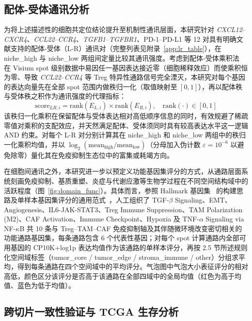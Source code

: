 \documentclass[12pt, a4paper]{ctexart}
\begin{document}
\subsection{配体-受体通讯分析}

为将上述描述性的细胞共定位结论提升至机制性通讯层面，本研究针对 \textit{CXCL12}--\textit{CXCR4}、\textit{CCL22}--\textit{CCR4}、\textit{TGFB1}--\textit{TGFBR1}、PD-1--PD-L1 等 12 对具有明确文献支持的配体-受体（L-R）通讯对（完整列表见附录~\ref{app:lr_table}），在 niche\_high 与 niche\_low 两组间定量比较其通讯强度。考虑到配体-受体乘积法~\citep{efremova2020cellphonedb} 在 Visium spot 级别数据中易因任一基因表达接近零（细胞稀释效应）而使乘积恒为零、导致 \textit{CCL22}--\textit{CCR4} 等 Treg 特异性通路信号完全湮灭，本研究对每个基因的表达向量先在全部 spot 范围内做秩归一化（取值映射至 $[0,1]$），再以配体秩与受体秩之积作为通讯强度的代理指标：
\begin{equation*}
\text{score}_{LR,i} = \text{rank}(E_{L,i}) \times \text{rank}(E_{R,i}), \quad \text{rank}(\cdot) \in [0,1]
\end{equation*}
该秩归一化乘积在保留配体与受体表达相对高低顺序信息的同时，有效规避了稀疏零值对乘积的支配效应，并天然满足配体、受体须同时具有较高表达水平这一逻辑 AND 约束。对每个 L-R 对分别计算其在 niche\_high 和 niche\_low 两组中的秩归一化乘积均值，并以 $\log_2(\text{mean}_{\text{high}}/\text{mean}_{\text{low}})$（分母加入伪计数 $\varepsilon = 10^{-6}$ 以避免除零）量化其在免疫抑制生态位中的富集或耗竭方向。

在细胞间通讯之外，本研究进一步以预定义功能基因集评分的方式，从通路层面系统刻画免疫抑制、基质重塑、炎症与代谢应激等生物学过程在不同空间结构域中的活跃程度（图~\ref{fig:domain_func}）。具体而言，参照 Hallmark 基因集~\citep{liberzon2015molecular} 的构建思路及单样本基因集评分的通用范式~\citep{barbie2009systematic}，人工组织了 TGF-$\beta$ Signaling、EMT、Angiogenesis、IL6-JAK-STAT3、Treg Immune Suppression、TAM Polarization (M2)、CAF Activation、Immune Checkpoint、Hypoxia 及 TNF-$\alpha$ Signaling via NF-$\kappa$B 共 10 条与 Treg--TAM--CAF 免疫抑制轴及其伴随微环境改变密切相关的功能通路基因集，每条通路包含 6 个代表性基因；对每个 spot 计算通路内全部可用基因的 CP10K+log1p 表达均值作为该通路的单样本评分，再按 2.5 节所述规则化空间域标签（tumor\_core / tumor\_edge / stroma\_immune / other）分组求平均，得到每条通路在四个空间域中的平均评分。气泡图中气泡大小表征评分的相对高低，颜色区分该评分是否高于该通路在全部四域中的全局均值（红色为高于均值、蓝色为低于均值）。

\subsection{跨切片一致性验证与 TCGA 生存分析}
\end{document}
